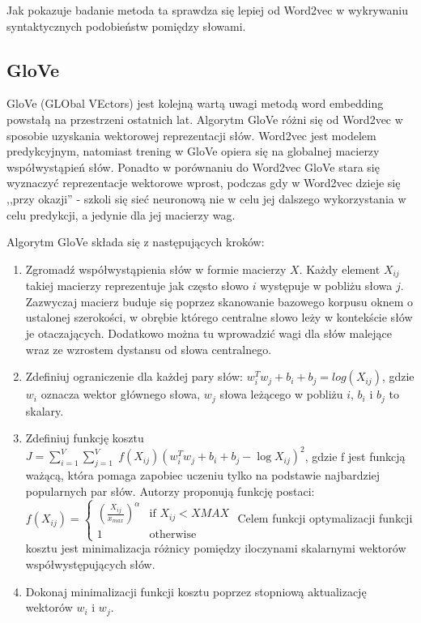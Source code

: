 \documentclass[pl]{minipw} %
\begin{document}
Jak pokazuje badanie\cite{fast_text_word2vec} metoda ta sprawdza się lepiej od Word2vec w wykrywaniu syntaktycznych podobieństw pomiędzy słowami. 

\subsection{GloVe}

GloVe\cite{glove} (GLObal VEctors) jest kolejną wartą uwagi metodą word embedding powstałą na przestrzeni ostatnich lat. Algorytm GloVe różni się od Word2vec w sposobie uzyskania wektorowej reprezentacji słów. Word2vec jest modelem predykcyjnym, natomiast trening w GloVe opiera się na globalnej macierzy współwystąpień słów. Ponadto w porównaniu do Word2vec GloVe stara się wyznaczyć reprezentacje wektorowe wprost, podczas gdy w Word2vec dzieje się ,,przy okazji'' - szkoli się sieć neuronową nie w celu jej dalszego wykorzystania w celu predykcji, a jedynie dla jej macierzy wag. 

Algorytm GloVe składa się z następujących kroków\cite{glove_cran}:
\begin{enumerate}
	\item Zgromadź współwystąpienia słów w formie macierzy $X$. Każdy element $X_{ij}$ takiej macierzy reprezentuje jak często słowo $i$ występuje w pobliżu słowa $j$. Zazwyczaj macierz buduje się poprzez skanowanie bazowego korpusu oknem o ustalonej szerokości, w obrębie którego centralne słowo leży w kontekście słów je otaczających. Dodatkowo można tu wprowadzić wagi dla słów malejące wraz ze wzrostem dystansu od słowa centralnego.
	\item Zdefiniuj ograniczenie dla każdej pary słów: $w_i^Tw_j + b_i + b_j = log(X_{ij})$, gdzie $w_i$ oznacza wektor głównego słowa, $w_j$ słowa leżącego w pobliżu $i$, $b_i$ i $b_j$ to skalary.
	\item Zdefiniuj funkcję kosztu $J = \sum_{i=1}^V \sum_{j=1}^V \; f(X_{ij}) ( w_i^T w_j + b_i + b_j - \log X_{ij})^2$, gdzie f jest funkcją ważącą, która pomaga zapobiec uczeniu tylko na podstawie najbardziej popularnych par słów. Autorzy proponują funkcję postaci:
	$f(X_{ij}) = 
	\begin{cases}
	(\frac{X_{ij}}{x_{max}})^\alpha & \text{if } X_{ij} < XMAX \\
	1 & \text{otherwise}
	\end{cases}$
	Celem funkcji optymalizacji funkcji	 kosztu jest minimalizacja różnicy pomiędzy iloczynami skalarnymi wektorów współwystępujących słów.
	\item Dokonaj minimalizacji funkcji kosztu poprzez stopniową aktualizację wektorów $w_i$ i $w_j$.
\end{enumerate}
\end{document}
